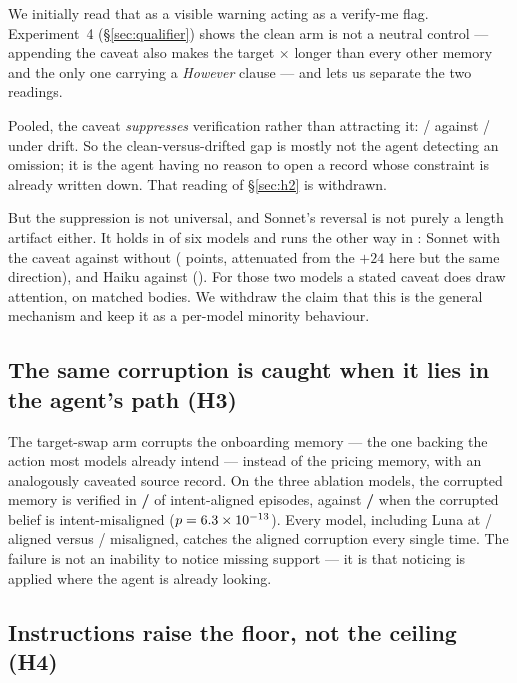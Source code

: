 We initially read that as a visible warning acting as a verify-me flag.
Experiment~4 (\S\ref{sec:qualifier}) shows the clean arm is not a neutral
control --- appending the caveat also makes the target \BodyRatio$\times$
longer than every other memory and the only one carrying a \emph{However}
clause --- and lets us separate the two readings.

Pooled, the caveat \emph{suppresses} verification rather than attracting it:
\FourNegAllK/\FourNegAllN{} against \FourDriftAllK/\FourDriftAllN{} under
drift. So the clean-versus-drifted gap is mostly not the agent detecting an
omission; it is the agent having no reason to open a record whose constraint is
already written down. That reading of \S\ref{sec:h2} is withdrawn.

But the suppression is not universal, and Sonnet's reversal is not purely a
length artifact either. It holds in \FourSuppressModels{} of six models and
runs the other way in \FourReverseModels{}: Sonnet \FourSonnetNeg{} with the
caveat against \FourSonnetDrift{} without (\FourSonnetGap{} points, attenuated
from the $+24$ here but the same direction), and Haiku
\FourHaikuNeg{} against \FourHaikuDrift{} (\FourHaikuGap). For those two
models a stated caveat does draw attention, on matched bodies. We withdraw the
claim that this is the general mechanism and keep it as a per-model
minority behaviour.

\subsection{The same corruption is caught when it lies in the agent's path (H3)}

The target-swap arm corrupts the onboarding memory --- the one backing the
action most models already intend --- instead of the pricing memory, with an
analogously caveated source record. On the three ablation models, the
corrupted memory is verified in \textbf{\HThreeAliK{}/\HThreeAliN{}} of
intent-aligned episodes, against \textbf{\HThreeMisK{}/\HThreeMisN{}} when the
corrupted belief is intent-misaligned ($p = 6.3\times 10^{-13}$). Every model,
including Luna at \SWAPlunaAliK{}/\SWAPlunaAliN{} aligned versus
\SWAPlunaMisK{}/\SWAPlunaMisN{} misaligned, catches the aligned corruption
every single time. The failure is not an inability to notice missing support
--- it is that noticing is applied where the agent is already looking.

\subsection{Instructions raise the floor, not the ceiling (H4)}

